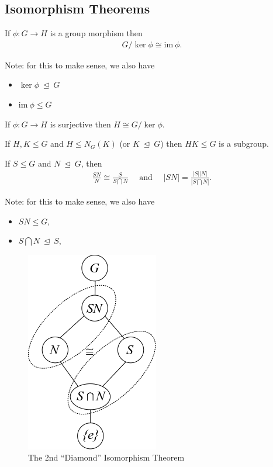 \hypertarget{isomorphism-theorems}{%
\subsection{Isomorphism Theorems}\label{isomorphism-theorems}}

If \(\phi:G\longrightarrow H\) is a group morphism then
\begin{align*}G/\ker \phi \cong {\text{im}~}\phi.\end{align*}

Note: for this to make sense, we also have

\begin{itemize}
\tightlist
\item
  \(\ker \phi {~\trianglelefteq~}G\)
\item
  \({\text{im}~}\phi \leq G\)
\end{itemize}

If \(\phi: G\longrightarrow H\) is surjective then
\(H\cong G/\ker \phi\).

If \(H,K \leq G\) and \(H \leq N_G(K)\) (or \(K {~\trianglelefteq~}G\))
then \(HK \leq G\) is a subgroup.

If \(S \leq G\) and \(N {~\trianglelefteq~}G\), then
\begin{align*}
\frac{SN}{N} \cong \frac{S}{S\bigcap N} \quad \text{ and }\quad {\left\lvert {SN} \right\rvert} = \frac{{\left\lvert {S} \right\rvert} {\left\lvert {N} \right\rvert}}{{\left\lvert {S\bigcap N} \right\rvert}}
.\end{align*}

Note: for this to make sense, we also have

\begin{itemize}
\tightlist
\item
  \(SN \leq G\),
\item
  \(S\bigcap N {~\trianglelefteq~}S\),
\end{itemize}

\begin{figure}
\centering
\includegraphics{figures/2020-01-01-15-20-27.png}
\caption{The 2nd ``Diamond'' Isomorphism Theorem}
\end{figure}

